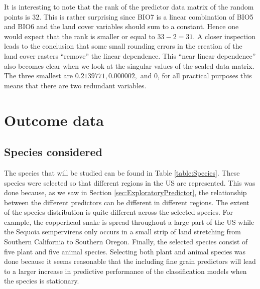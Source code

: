 It is interesting to note that the rank of the predictor data matrix of the random points is $32$. This is rather surprising since BIO7 is a linear combination of BIO5 and BIO6 and the land cover variables should sum to a constant. Hence one would expect that the rank is smaller or equal to $33-2 =31$. A closer inspection leads to the conclusion that some small rounding errors in the creation of the land cover rasters ``remove'' the linear dependence. This ``near linear dependence'' also becomes clear when we look at the singular values of the scaled data matrix. The three smallest are $0.2139771, 0.000002,$ and $0$, for all practical purposes this means that there are two redundant variables.\\

\section{Outcome data}
\label{sec:OutcomeData}
\subsection{Species considered}
The species that will be studied can be found in Table \ref{table:Species}. These species were selected so that different regions in the US are represented. This was done because, as we saw in Section \ref{sec:ExploratoryPredictor}, the relationship between the different predictors can be different in different regions. The extent of the species distribution is quite different across the selected species. For example, the copperhead snake is spread throughout a large part of the US while the Sequoia sempervirens only occurs in a small strip of land stretching from Southern California to Southern Oregon. Finally, the selected species consist of five plant and five animal species. Selecting both plant and animal species was done because it seems reasonable that the including fine grain predictors will lead to a larger increase in predictive performance of the classification models when the species is stationary.\\

